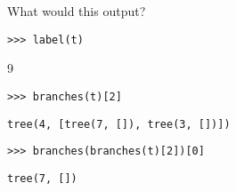 \begin{blocksection}
\question What would this output?

\begin{lstlisting}
>>> label(t)
\end{lstlisting}
\begin{solution}[.25in]
9
\end{solution}

\begin{lstlisting}
>>> branches(t)[2]
\end{lstlisting}
\begin{solution}[.25in]
\begin{lstlisting}
tree(4, [tree(7, []), tree(3, [])])
\end{lstlisting}
\end{solution}

\begin{lstlisting}
>>> branches(branches(t)[2])[0]
\end{lstlisting}
\begin{solution}[.25in]
\begin{lstlisting}
tree(7, [])
\end{lstlisting}
\end{solution}
\end{blocksection}
